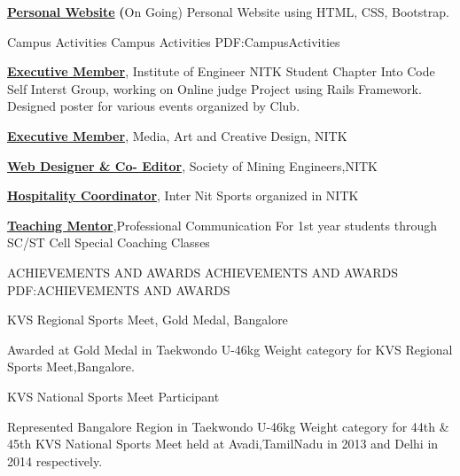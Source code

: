 \documentclass[letterpaper,MMMyyyy,nonstopmode]{simpleresumecv}
\begin{document}
\begin{Body}
\Entry
\BulletItem
\href{https://github.com/santhoshakashs24/santhoshakashs24.github.io}
{\color{blue} \textbf{Personal Website}}
{\textbf(On Going)}
\SubBulletItem
Personal Website using HTML, CSS, Bootstrap.


\Section
{Campus Activities}
{Campus Activities}
{PDF:CampusActivities}


\Entry
\BulletItem
\href{https://www.facebook.com/MACD.NITK/}
{\textbf{Executive Member}},
Institute of Engineer NITK Student Chapter
\hfill
\SubBulletItem
Into Code Self Interst Group, working on Online judge Project using Rails Framework.
\SubBulletItem
Designed poster for various events organized by Club.

\Entry
\BulletItem
\href{https://www.facebook.com/MACD.NITK/}
{\textbf{Executive Member}},
Media, Art and Creative Design, NITK
\hfill
\Gap 

\Entry
\BulletItem
\href{https://smenitk.000webhostapp.com/}
{\textbf{Web Designer \& Co- Editor}},
Society of Mining Engineers,NITK 
\hfill
\Gap 

\Entry
\BulletItem
\href{https://www.facebook.com/interNITSports//}
{\textbf{Hospitality Coordinator}},
Inter Nit Sports organized in NITK
\Gap 

\Entry
\BulletItem
\href{http://nitk.ac.in/scst-cell}
{\textbf{Teaching Mentor}},Professional Communication
\SubBulletItem
For 1st year students through SC/ST Cell Special Coaching Classes
\Gap


\Section
{ACHIEVEMENTS
AND AWARDS}
{ACHIEVEMENTS AND AWARDS}
{PDF:ACHIEVEMENTS AND AWARDS}

\BulletItem
KVS Regional Sports Meet, Gold Medal, Bangalore 
\hfill
\begin{Detail}
\Item
Awarded at Gold Medal in Taekwondo U-46kg Weight category for KVS Regional Sports Meet,Bangalore.
\end{Detail}

\Gap
\BulletItem
KVS National Sports Meet Participant
\hfill
\begin{Detail}
\Item
Represented Bangalore Region in Taekwondo U-46kg Weight category for 44th \& 45th KVS National Sports Meet held at Avadi,TamilNadu in 2013 and Delhi in 2014 respectively.
\end{Detail}


\end{Body}
\end{document}
